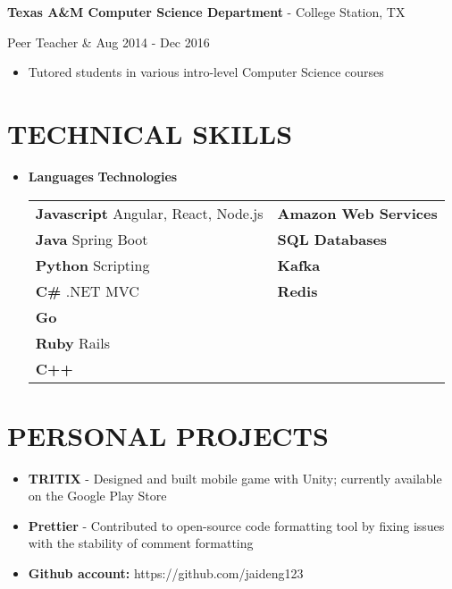 \documentclass[margin,10pt]{res} %
\begin{document}
\begin{resume}
\begin{itemize}
                \end{itemize}
				{\bf Texas A\&M Computer Science Department} - College Station, TX \\ 
                \begin{ncolumn}{2} %
                Peer Teacher &  \hfill Aug 2014 - Dec 2016 
                \end{ncolumn}
                \begin{itemize}           
                \item Tutored students in various intro-level Computer Science courses
                \end{itemize}
 

                    
\section{TECHNICAL SKILLS}	
							\begin{itemize}
                    		\item[] 
\textbf{\large Languages}  \hspace*{1.4in} \textbf{\large Technologies}        \\
\begin{tabular}{ll}
\textbf{Javascript} Angular, React, Node.js  & \textbf{Amazon Web Services} \\
\textbf{Java} Spring Boot   & \textbf{SQL Databases}       \\
\textbf{Python} Scripting  & \textbf{Kafka}               \\
\textbf{C\#} .NET MVC     & \textbf{Redis}               \\
\textbf{Go}        &                     \\
\textbf{Ruby}  Rails     &                     \\
\textbf{C++}        &                    
\end{tabular}
                    		\end{itemize} 
\section{PERSONAL PROJECTS}
				\begin{itemize}           
                	\item \textbf{TRITIX} - Designed and built mobile game with Unity; currently available on the Google Play Store
                	\item \textbf{Prettier} - Contributed to open-source code formatting tool by fixing issues with the stability of comment formatting
                	\item[] \textbf{Github account:} https://github.com/jaideng123
                \end{itemize}
\end{resume} 
\end{document}
